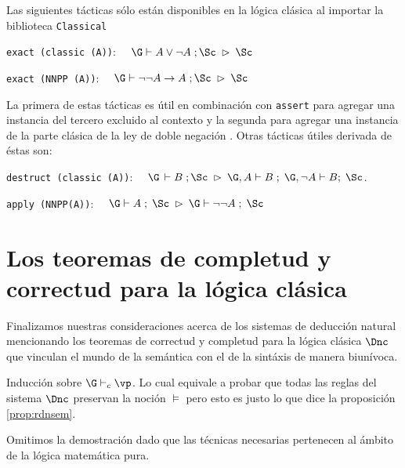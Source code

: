 \documentclass[11pt,letterpaper]{article}
\begin{document}
Las siguientes tácticas sólo están disponibles en la lógica clásica al importar 
la biblioteca \texttt{Classical}
\bi
 \item \texttt{exact (classic (A))}: 
  $\quad \G\vdash A\lor\neg A\;;\Sc \;\rhd\;\Sc$
 \item \texttt{exact (NNPP (A))}: 
  $\quad \G\vdash \neg\neg A\to A\;;\Sc \;\rhd\;\Sc$
\ei

La primera de estas tácticas es útil en combinación con \texttt{assert} para 
agregar una instancia del tercero excluido al contexto y la segunda para 
agregar una instancia de la parte clásica de la ley de doble negación . Otras 
tácticas útiles derivada de éstas son:
\bi
 \item \texttt{destruct (classic (A))}: 
  $\quad \G\,\vdash B\;;\Sc\;\rhd\; \G,A\vdash B\;;\;\G,\neg A\vdash B;\;\Sc$.
 \item \texttt{apply (NNPP(A))}: 
  $\quad \G\vdash A\;;\;\Sc\;\rhd\;\G\vdash\neg\neg A\;;\;\Sc$
\ei


\section{Los teoremas de completud y correctud para la lógica clásica}

Finalizamos nuestras consideraciones acerca de los sistemas de deducción
natural mencionando los teoremas de correctud y completud para la lógica
clásica $\Dnc$ que vinculan el mundo de la semántica con el de la sintáxis 
de manera biunívoca.

\proof Inducción sobre $\G\vdash_c\vp$. Lo cual equivale a probar
que todas las reglas del sistema $\Dnc$ preservan la noción $\models$ pero esto 
es justo lo que dice la proposición 
\ref{prop:rdnsem}.


\proof
Omitimos la demostración dado que las técnicas necesarias pertenecen al
ámbito de la lógica matemática pura.
\end{document}
